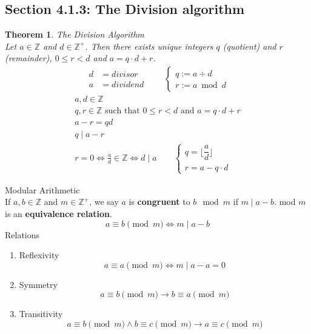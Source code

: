 \documentclass[letterpaper, 12pt]{article}
\newtheorem{theorem}{Theorem}[section]
\newenvironment{definition}[1][Definition]{\begin{trivlist}
\item[\hskip \labelsep {\bfseries #1}]}{\end{trivlist}}
\newcommand{\keyword}[1]{\textbf{#1}}
\newcommand{\then}{\rightarrow}
\newcommand{\Z}{\mathbb{Z}}
\newcommand{\0}{\emptyset}
\begin{document}
    \subsection*{Section 4.1.3: The Division algorithm}
    \begin{theorem}
        The Division Algorithm \\
        Let $a \in \Z$ and $d \in \Z^+$. Then there exists unique integers $q$ (quotient) and 
        $r$ (remainder), $0 \le r < d$ and $a = q \cdot d + r$. \\
        \begin{gather*}
            \begin{aligned}
                d &= divisor \\
                a &= dividend
            \end{aligned}
            \qquad
            \begin{cases}
                q := a \div d \\
                r := a \bmod d
            \end{cases}
        \end{gather*}
        \begin{gather*}
            a, d \in \Z \\
            q, r \in \Z \text{ such that } 0 \le r < d \text{ and } a = q \cdot d + r \\
            a - r = qd \\
            q \mid a - r \\
            r = 0 \iff \frac{a}{d} \in \Z \iff d \mid a \qquad \begin{cases}
                q = \lfloor\dfrac{a}{d}\rfloor \\
                r = a - q \cdot d
            \end{cases}
        \end{gather*}
    \end{theorem}
    \begin{definition}
        Modular Arithmetic \\
        If $a, b \in \Z$ and $m \in \Z^+$, we say $a$ is \keyword{congruent} to $b \mod m$ if 
        $m \mid a - b$. mod $m$ is an \keyword{equivalence relation}.
        \[a \equiv b \pmod m \iff m \mid a - b\]
        Relations
        \begin{enumerate}
            \item Reflexivity
            \[a \equiv a \pmod m \iff m \mid a - a = 0\]
            \item Symmetry
            \[a \equiv b \pmod m \then b \equiv a \pmod m\]
            \item Transitivity
            \[a \equiv b \pmod m \wedge b \equiv c \pmod m \then a \equiv c \pmod m\]
        \end{enumerate}
    \end{definition}
\end{document}
